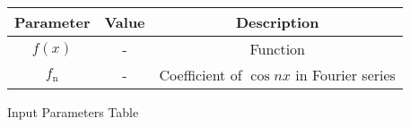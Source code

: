 \centering
\begin{tabular}{|c|c|c|}
	\hline
	\textbf{Parameter} & \textbf{Value} & \textbf{Description} \\
	\hline
	$f(x)$ & - & Function \\
	\hline
	$f_{\text{n}}$ & - & Coefficient of $\cos{nx}$ in Fourier series\\
	\hline
\end{tabular}
\caption{Input Parameters Table}
\label{tab:gateCE22.30.1}
